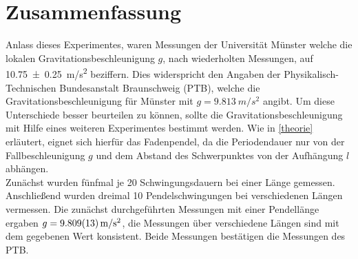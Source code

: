 \section{Zusammenfassung}
Anlass dieses Experimentes, waren Messungen der Universität Münster welche die lokalen Gravitationsbeschleunigung $g$, nach wiederholten Messungen, auf \SI{10,75+-0,25}{m/s^2} beziffern. Dies widerspricht den Angaben der Physikalisch-Technischen Bundesanstalt Braunschweig (PTB), welche die Gravitationsbeschleunigung für Münster mit $g=\SI{9,813}{m/s^2}$ angibt. Um diese Unterschiede besser beurteilen zu können, sollte die Gravitationsbeschleunigung mit Hilfe eines weiteren Experimentes bestimmt werden. Wie in \cref{theorie} erläutert, eignet sich hierfür das Fadenpendel, da die Periodendauer nur von der Fallbeschleunigung $g$ und dem Abstand des Schwerpunktes von der Aufhängung $l$ abhängen.\\
Zunächst wurden fünfmal je 20 Schwingungsdauern bei einer Länge gemessen. Anschließend wurden dreimal 10 Pendelschwingungen bei verschiedenen Längen vermessen. Die zunächst durchgeführten Messungen mit einer Pendellänge ergaben $g=\SI{9,809+-0,013}{m/s^2}$, die Messungen über verschiedene Längen sind mit dem gegebenen Wert konsistent. Beide Messungen bestätigen die Messungen des PTB.